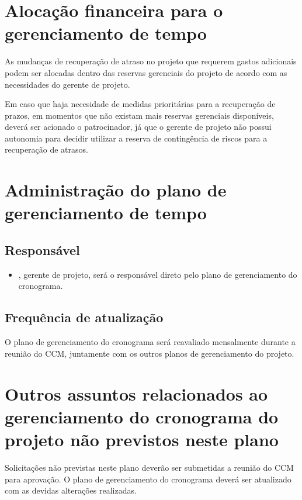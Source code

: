 \section{Alocação financeira para o gerenciamento de tempo}

As mudanças de recuperação de atraso no projeto que requerem gastos adicionais podem ser alocadas dentro das reservas gerenciais do projeto de acordo com as necessidades do gerente de projeto.

Em caso que haja necesidade de medidas prioritárias para a recuperação de prazos, em momentos que não existam mais reservas gerenciais disponíveis, deverá ser acionado o patrocinador, já que o gerente de projeto não possui autonomia para decidir utilizar a reserva de contingência de riscos para a recuperação de atrasos.

\section{Administração do plano de gerenciamento de tempo}

\subsection{Responsável}

\begin{itemize}
	\item \projectManagerName, gerente de projeto, será o responsável direto pelo plano de gerenciamento do cronograma.
\end{itemize}

\subsection{Frequência de atualização}

O plano de gerenciamento do cronograma será reavaliado mensalmente durante a reunião do CCM, juntamente com os outros planos de gerenciamento do projeto.

\section{Outros assuntos relacionados ao gerenciamento do cronograma do projeto não previstos neste plano}

Solicitações não previstas neste plano deverão ser submetidas a reunião do CCM para aprovação. O plano de gerenciamento do cronograma deverá ser atualizado com as devidas alterações realizadas.

